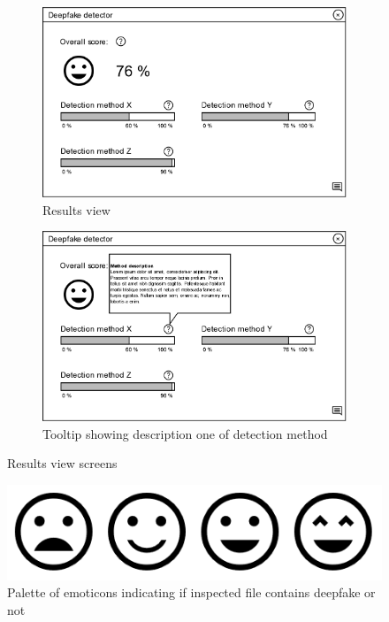 \begin{figure}[H]
    \begin{subfigure}[h]{.475\linewidth}
        \centering
        \includegraphics[width=1\linewidth]{other-fig/client_wireframe_results.png}
        \caption{Results view}
    \end{subfigure}
    \hfill
    \begin{subfigure}[h]{.475\linewidth}
        \centering
        \includegraphics[width=1\linewidth]{other-fig/client_wireframe_results2.png}
        \caption{Tooltip showing description one of detection method}
    \end{subfigure} 
    \caption{Results view screens}
    \label{fig:client_wireframe_results}
\end{figure}

\begin{figure}[H]
    \centering
    \includegraphics[width=.4\linewidth]{other-fig/client_wireframe_results3.png}        
    \caption{Palette of emoticons indicating if inspected file contains deepfake or not}
\label{fig:client_wireframe_results3}
\end{figure}

